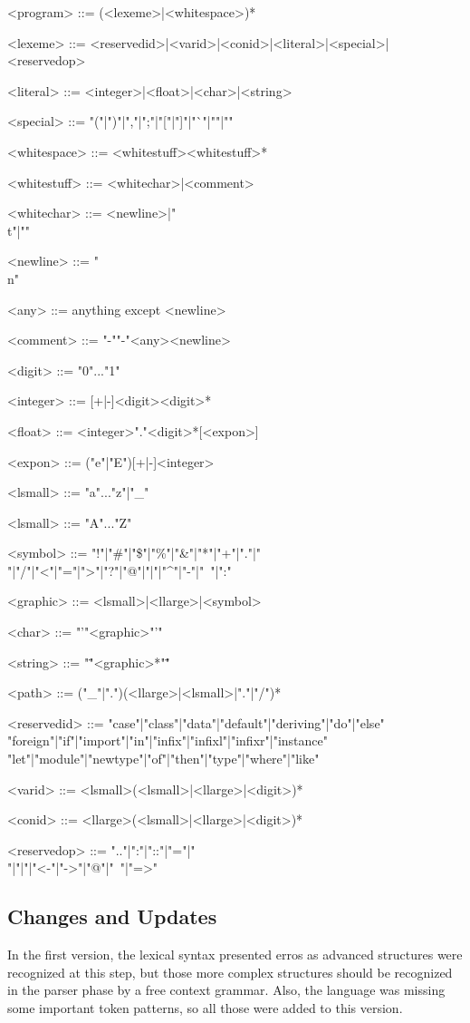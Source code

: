 \documentclass{article}
\begin{document}
\begin{grammar}
<program> ::= (<lexeme>|<whitespace>)*

<lexeme> ::= <reservedid>|<varid>|<conid>|<literal>|<special>|<reservedop>

<literal> ::= <integer>|<float>|<char>|<string>

<special> ::= "("|")"|","|";"|"["|"]"|"`"|"{"|"}"

<whitespace> ::= <whitestuff><whitestuff>*

<whitestuff> ::= <whitechar>|<comment>

<whitechar> ::= <newline>|"\\t"|"\textvisiblespace"

<newline> ::= "\\n"

<any> ::= anything except <newline>

<comment> ::= "-""-"<any><newline>

<digit> ::= "0"..."1"

<integer> ::= [+|-]<digit><digit>*

<float> ::= <integer>"."<digit>*[<expon>]

<expon> ::= ("e"|"E")[+|-]<integer>

<lsmall> ::= "a"..."z"|"_"

<lsmall> ::= "A"..."Z"

<symbol> ::= "!"|"#"|"\$"|"\%"|"&"|"*"|"+"|"."|"\\"|"/"|"<"|"="|">"|"?"|"@"|"|"|"^"|"-"|"~"|":"

<graphic> ::= <lsmall>|<llarge>|<symbol>

<char> ::= "'"<graphic>"'"

<string> ::= "\""<graphic>*"\""

<path> ::= ("_"|".")(<llarge>|<lsmall>|"."|"/")*

<reservedid> ::= "case"|"class"|"data"|"default"|"deriving"|"do"|"else"
\alt"foreign"|"if"|"import"|"in"|"infix"|"infixl"|"infixr"|"instance"
\alt"let"|"module"|"newtype"|"of"|"then"|"type"|"where"|"like"

<varid> ::= <lsmall>(<lsmall>|<llarge>|<digit>)*

<conid> ::= <llarge>(<lsmall>|<llarge>|<digit>)*

<reservedop> ::= ".."|":"|"::"|"="|"\\"|"|"|"<-"|"->"|"@"|"~"|"=>"
\end{grammar}

\subsection{Changes and Updates}
In the first version, the lexical syntax presented erros as advanced structures
were recognized at this step, but those more complex structures should be
recognized in the parser phase by a free context grammar. Also, the language
was missing some important token patterns, so all those were added to this
version.
\end{document}
